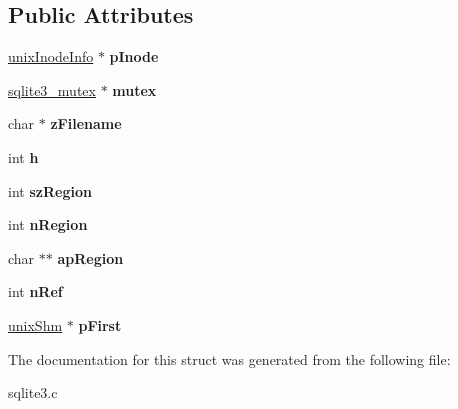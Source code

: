 \subsection*{Public Attributes}
\begin{DoxyCompactItemize}
\item 
\hypertarget{structunix_shm_node_ab6bc1cf84d65887a3395da6406843817}{\hyperlink{structunix_inode_info}{unix\-Inode\-Info} $\ast$ {\bfseries p\-Inode}}\label{structunix_shm_node_ab6bc1cf84d65887a3395da6406843817}

\item 
\hypertarget{structunix_shm_node_aa90850530f48fec6f2a872874f8ddf1f}{\hyperlink{structsqlite3__mutex}{sqlite3\-\_\-mutex} $\ast$ {\bfseries mutex}}\label{structunix_shm_node_aa90850530f48fec6f2a872874f8ddf1f}

\item 
\hypertarget{structunix_shm_node_a188c3bc5fcb4666ad0817ac093e7505d}{char $\ast$ {\bfseries z\-Filename}}\label{structunix_shm_node_a188c3bc5fcb4666ad0817ac093e7505d}

\item 
\hypertarget{structunix_shm_node_a9cd93c8052eb47f257e2d752e8f1fdba}{int {\bfseries h}}\label{structunix_shm_node_a9cd93c8052eb47f257e2d752e8f1fdba}

\item 
\hypertarget{structunix_shm_node_ae8126f9db70a758c2f340ec06869e02b}{int {\bfseries sz\-Region}}\label{structunix_shm_node_ae8126f9db70a758c2f340ec06869e02b}

\item 
\hypertarget{structunix_shm_node_a7cb3ca3dd29e6f845304000b83dff03a}{int {\bfseries n\-Region}}\label{structunix_shm_node_a7cb3ca3dd29e6f845304000b83dff03a}

\item 
\hypertarget{structunix_shm_node_a8eff550f9b10a2de463e9874f84efc5e}{char $\ast$$\ast$ {\bfseries ap\-Region}}\label{structunix_shm_node_a8eff550f9b10a2de463e9874f84efc5e}

\item 
\hypertarget{structunix_shm_node_a6d9f0c9dec3f6710cb09c90723a8284b}{int {\bfseries n\-Ref}}\label{structunix_shm_node_a6d9f0c9dec3f6710cb09c90723a8284b}

\item 
\hypertarget{structunix_shm_node_a0ddd6c4625acf5994a60b0c368bc665e}{\hyperlink{structunix_shm}{unix\-Shm} $\ast$ {\bfseries p\-First}}\label{structunix_shm_node_a0ddd6c4625acf5994a60b0c368bc665e}

\end{DoxyCompactItemize}


The documentation for this struct was generated from the following file\-:\begin{DoxyCompactItemize}
\item 
sqlite3.\-c\end{DoxyCompactItemize}
